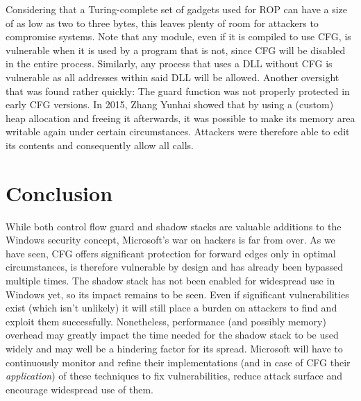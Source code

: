 \documentclass[10pt,twocolumn,a4paper]{article}
\begin{document}
Considering that a Turing-complete set of gadgets used for ROP can have a size of as low as two to three bytes, this leaves plenty of room for attackers to compromise systems\cite{Turing}.
Note that any module, even if it is compiled to use CFG, is vulnerable when it is used by a program that is not, since CFG will be disabled in the entire process\cite{cfgexplore}.
Similarly, any process that uses a DLL without CFG is vulnerable as all addresses within said DLL will be allowed\cite{cfgbypass2}.
Another oversight that was found rather quickly: The guard function was not properly protected in early CFG versions.
In 2015, Zhang Yunhai showed that by using a (custom) heap allocation and freeing it afterwards,  it was possible to make its memory area writable again under certain circumstances\cite{cfgbypass}.
Attackers were therefore able to edit its contents and consequently allow all calls.


\section{Conclusion}\label{sec:conclusion}

While both control flow guard and shadow stacks are valuable additions to the Windows security concept, Microsoft's war on hackers is far from over. As we have seen, CFG offers significant protection for forward edges only in optimal circumstances, is therefore vulnerable by design and has already been bypassed multiple times. The shadow stack has not been enabled for widespread use in Windows yet, so its impact remains to be seen. Even if significant vulnerabilities exist (which isn't unlikely) it will still place a burden on attackers to find and exploit them successfully.
Nonetheless, performance (and possibly memory) overhead may greatly impact the time needed for the shadow stack to be used widely and may well be a hindering factor for its spread.
Microsoft will have to continuously monitor and refine their implementations (and in case of CFG their \emph{application}) of these techniques to fix vulnerabilities, reduce attack surface and encourage widespread use of them.




\end{document}
